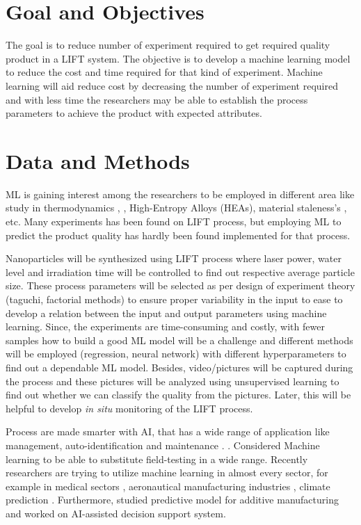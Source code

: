 \documentclass[letterpaper]{article}
\begin{document}
\section*{Goal and Objectives}
The goal is to reduce number of experiment required to get required quality product in a LIFT system. The objective is to develop a machine learning model to reduce the cost and time required for that kind of experiment. Machine learning will aid reduce cost by decreasing the number of experiment required and with less time the researchers may be able to establish the process parameters to achieve the product with expected attributes.
\pagebreak

\section*{Data and Methods}
ML is gaining interest among the researchers to be employed in different area like study in thermodynamics \parencite[]{ding}, \parencite[]{thermal},  High-Entropy Alloys (HEAs)\parencite[]{qiao}, material staleness's \parencite[]{he}, etc. Many experiments has been found on LIFT process, but employing ML to predict the product quality has hardly been found implemented for that process.
\par
Nanoparticles will be synthesized using LIFT process where laser power, water level and irradiation time will be controlled to find out respective average particle size. These process parameters will be selected as per design of experiment theory (taguchi, factorial methods) to ensure proper variability in the input to ease to develop a relation between the input and output parameters using machine learning. Since, the experiments are time-consuming and costly, with fewer samples how to build a good ML model will be a challenge and different methods will be employed (regression, neural network) with different hyperparameters to find out a dependable ML model. Besides, video/pictures will be captured during the process and these pictures will be analyzed using unsupervised learning to find out whether we can classify the quality from the pictures. Later, this will be helpful to develop \textit{in situ} monitoring of the LIFT process.\par
Process are made smarter with AI, that has a wide range of application like management, auto-identification and maintenance \parencite[]{xu}. \parencite[]{bourhis}. Considered Machine learning to be able to substitute field-testing in a wide range. Recently researchers are trying to utilize machine learning in almost every sector, for example in medical sectors \parencite[]{twin}, aeronautical manufacturing industries \parencite[]{zohdi}, climate prediction \parencite[]{koc}.  Furthermore, \parencite[]{tapia}  studied predictive model for additive manufacturing and \parencite[]{kharchenko} worked on AI-assisted decision support system.
\end{document}
